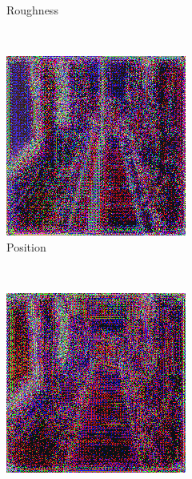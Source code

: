 \begin{figure}[h!]
\begin{subfigure}[b]{0.175\textwidth}
     \caption{Roughness}
    \end{subfigure} 
    \\ \vspace{0.2cm} %
    \begin{subfigure}[b]{0.175\textwidth}
     \includegraphics[width=\textwidth]{figures/result/triple/emissive_metalness_position/2.png}
     \caption{Position}\label{subfig:1}
    \end{subfigure}
    ~
    \begin{subfigure}[b]{0.175\textwidth}
     \includegraphics[width=\textwidth]{figures/result/triple/emissive_metalness_roughness/2.png}

\end{subfigure}
\end{figure}
